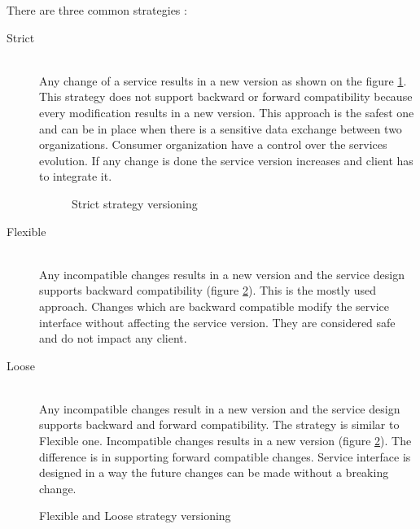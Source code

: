 There are three common strategies \cite{soa-governance}:

\begin{description}
  \item[Strict]  \hfill \\
  Any change of a service results in a new version as shown on the figure \ref{fig:strict-strategy}. This strategy does not support backward or forward compatibility because every modification results in a new version. This approach is the safest one and can be in place when there is a sensitive data exchange between two organizations. Consumer organization have a control over the services evolution. If any change is done the service version increases and client has to integrate it. 
    
\begin{figure}[htp] 
\caption{Strict strategy versioning}
\label{fig:strict-strategy}
\end{figure} 

  \item[Flexible] \hfill \\
  Any incompatible changes results in a new version and the service design supports backward compatibility (figure \ref{fig:flexible-strategy}). This is the mostly used approach. Changes which are backward compatible modify the service interface without affecting the service version. They are considered safe and do not impact any client.
  
  \item[Loose] \hfill \\
  Any incompatible changes result in a new version and the service design supports backward and forward compatibility. The strategy is similar to Flexible one. Incompatible changes results in a new version (figure \ref{fig:flexible-strategy}). The difference is in supporting forward compatible changes. Service interface is designed in a way the future changes can be made without a breaking change.
\end{description}

\begin{figure}[htp] 
\caption{Flexible and Loose strategy versioning}
\label{fig:flexible-strategy}
\end{figure} 

